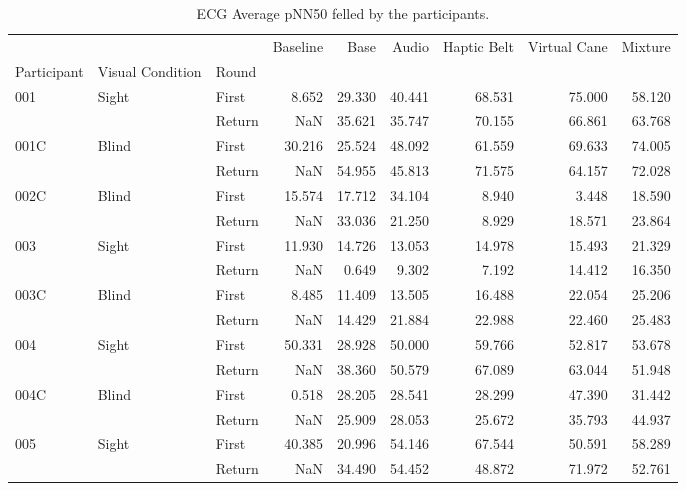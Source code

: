 
\begin{table}[!htb]
\centering
\caption{ECG Average pNN50 felled by the participants.}
\label{tab:ecg_pnn50_table}
\begin{tabular}{lllrrrrrr}
\toprule
    &       &        &  Baseline &   Base &  Audio &  Haptic Belt &  Virtual Cane &  Mixture \\
Participant & Visual Condition & Round &           &        &        &              &               &          \\
\midrule
001 & Sight & First &     8.652 & 29.330 & 40.441 &       68.531 &        75.000 &   58.120 \\
    &       & Return &       NaN & 35.621 & 35.747 &       70.155 &        66.861 &   63.768 \\
001C & Blind & First &    30.216 & 25.524 & 48.092 &       61.559 &        69.633 &   74.005 \\
    &       & Return &       NaN & 54.955 & 45.813 &       71.575 &        64.157 &   72.028 \\
002C & Blind & First &    15.574 & 17.712 & 34.104 &        8.940 &         3.448 &   18.590 \\
    &       & Return &       NaN & 33.036 & 21.250 &        8.929 &        18.571 &   23.864 \\
003 & Sight & First &    11.930 & 14.726 & 13.053 &       14.978 &        15.493 &   21.329 \\
    &       & Return &       NaN &  0.649 &  9.302 &        7.192 &        14.412 &   16.350 \\
003C & Blind & First &     8.485 & 11.409 & 13.505 &       16.488 &        22.054 &   25.206 \\
    &       & Return &       NaN & 14.429 & 21.884 &       22.988 &        22.460 &   25.483 \\
004 & Sight & First &    50.331 & 28.928 & 50.000 &       59.766 &        52.817 &   53.678 \\
    &       & Return &       NaN & 38.360 & 50.579 &       67.089 &        63.044 &   51.948 \\
004C & Blind & First &     0.518 & 28.205 & 28.541 &       28.299 &        47.390 &   31.442 \\
    &       & Return &       NaN & 25.909 & 28.053 &       25.672 &        35.793 &   44.937 \\
005 & Sight & First &    40.385 & 20.996 & 54.146 &       67.544 &        50.591 &   58.289 \\
    &       & Return &       NaN & 34.490 & 54.452 &       48.872 &        71.972 &   52.761 \\
\bottomrule
\end{tabular}
\end{table}

